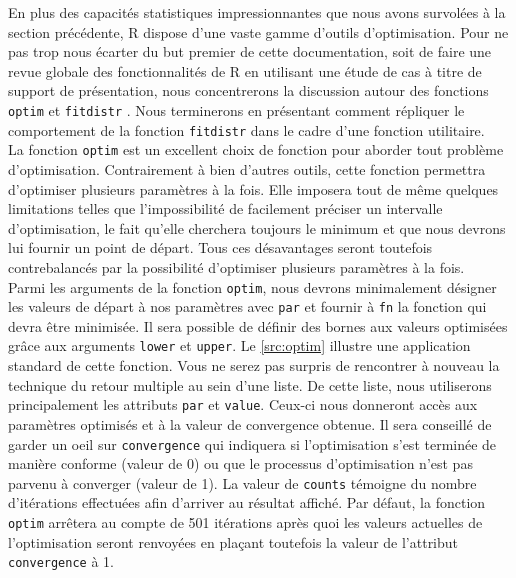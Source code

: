 En plus des capacités statistiques impressionnantes que nous avons survolées à la section précédente, R dispose d'une vaste gamme d'outils d'optimisation. Pour ne pas trop nous écarter du but premier de cette documentation, soit de faire une revue globale des fonctionnalités de R en utilisant une étude de cas à titre de support de présentation, nous concentrerons la discussion autour des fonctions \texttt{optim} \cite{Rfunction:optim} et \texttt{fitdistr} \cite{Rfunction:fitdistr}. Nous terminerons en présentant comment répliquer le comportement de la fonction \texttt{fitdistr} dans le cadre d'une fonction utilitaire. \\

La fonction \texttt{optim} est un excellent choix de fonction pour aborder tout problème d'optimisation. Contrairement à bien d'autres outils, cette fonction permettra d'optimiser plusieurs paramètres à la fois. Elle imposera tout de même quelques limitations telles que l'impossibilité de facilement préciser un intervalle d'optimisation, le fait qu'elle cherchera toujours le minimum et que nous devrons lui fournir un point de départ. Tous ces désavantages seront toutefois contrebalancés par la possibilité d'optimiser plusieurs paramètres à la fois. \cite{optim} \\

Parmi les arguments de la fonction \texttt{optim}, nous devrons minimalement désigner les valeurs de départ à nos paramètres avec \texttt{par} et fournir à \texttt{fn} la fonction qui devra être minimisée. Il sera possible de définir des bornes aux valeurs optimisées grâce aux arguments \texttt{lower} et \texttt{upper}. Le \autoref{src:optim} illustre une application standard de cette fonction. Vous ne serez pas surpris de rencontrer à nouveau la technique du retour multiple au sein d'une liste. De cette liste, nous utiliserons principalement les attributs \texttt{par} et \texttt{value}. Ceux-ci nous donneront accès aux paramètres optimisés et à la valeur de convergence obtenue. Il sera conseillé de garder un oeil sur \texttt{convergence} qui indiquera si l'optimisation s'est terminée de manière conforme (valeur de 0) ou que le processus d'optimisation  n’est pas parvenu à converger (valeur de 1). La valeur de \texttt{counts} témoigne du nombre d'itérations effectuées afin d'arriver au résultat affiché. Par défaut, la fonction \texttt{optim} arrêtera au compte de 501 itérations après quoi les valeurs actuelles de l'optimisation seront renvoyées en plaçant toutefois la valeur de l'attribut \texttt{convergence} à 1. \\

